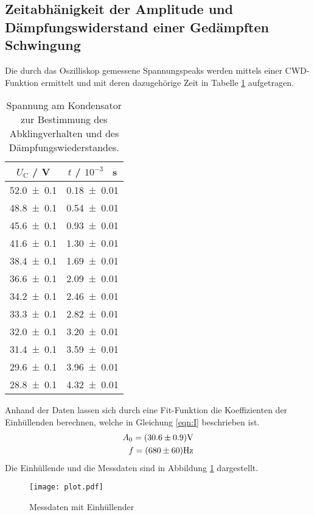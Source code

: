 \subsection{Zeitabhänigkeit der Amplitude und Dämpfungswiderstand einer Gedämpften Schwingung}
Die durch das Oszilliskop gemessene Spannungspeaks werden mittels einer CWD-Funktion ermittelt und mit deren dazugehörige Zeit in Tabelle \ref{tab:U_C} aufgetragen.
\begin{table}
  \centering
  \begin{tabular}{c c}
    \toprule
    	$U_\text{C}$ / V & $t$ / $10^{-3}$ \, s\\
    \midrule
    \num{52.0 +- 0.1}  	& \num{0.18 +- 0.01}	\\
    \num{48.8 +- 0.1}	& \num{0.54 +- 0.01}	\\
    \num{45.6 +- 0.1}	& \num{0.93 +- 0.01} 	\\
    \num{41.6 +- 0.1}	& \num{1.30 +- 0.01}	\\
    \num{38.4 +- 0.1}	& \num{1.69 +- 0.01}	\\
    \num{36.6 +- 0.1}	& \num{2.09 +- 0.01} 	\\
    \num{34.2 +- 0.1}	& \num{2.46 +- 0.01}	\\
    \num{33.3 +- 0.1} 	& \num{2.82 +- 0.01}	\\
    \num{32.0 +- 0.1} 	& \num{3.20 +- 0.01} 	\\
    \num{31.4 +- 0.1}	& \num{3.59 +- 0.01}	\\
    \num{29.6 +- 0.1}	& \num{3.96 +- 0.01}	\\
    \num{28.8 +- 0.1}	& \num{4.32 +- 0.01} 	\\
    \bottomrule
  \end{tabular}
  \caption{Spannung am Kondensator zur Bestimmung des Abklingverhalten und des Dämpfungswiederstandes.}
  \label{tab:U_C}
\end{table}
Anhand der Daten lassen sich durch eine Fit-Funktion die Koeffizienten der Einhüllenden berechnen, welche in Gleichung \ref{eqn:I} beschrieben ist.
\begin{eqnarray}
  A_0 = ( \num{30.6 +- 0.9} ) \text{V} \\
  f = ( \num{680 +- 60} ) \text{Hz}
  \label{eqn:Koef}
\end{eqnarray}
Die Einhüllende und die Messdaten sind in Abbildung \ref{fig:Osz} dargestellt.
\begin{figure}
  \centering
  \texttt{[image: plot.pdf]}
  \caption{Messdaten mit Einhüllender}
  \label{fig:Osz}
\end{figure}

